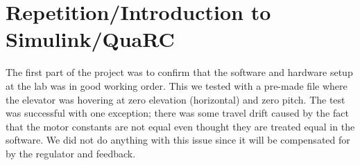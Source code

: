 \section{Repetition/Introduction to Simulink/QuaRC}\label{sec:prob1}
The first part of the project was to confirm that the software and hardware setup at the lab was in good working order. This we tested with a pre-made file where the elevator was hovering at zero elevation (horizontal) and zero pitch. The test was successful with one exception; there was some travel drift caused by the fact that the motor constants are not equal even thought they are treated equal in the software. We did not do anything with this issue since it will be compensated for by the regulator and feedback.